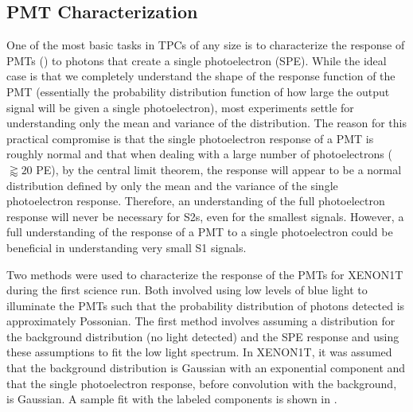 
\subsection{PMT Characterization}
\label{sec:xe1t_pmt}

One of the most basic tasks in TPCs of any size is to characterize the response of PMTs () to photons that create a single photoelectron (SPE).  While the ideal case is that we completely understand the shape of the response function of the PMT (essentially the probability distribution function of how large the output signal will be given a single photoelectron), most experiments settle for understanding only the mean and variance of the distribution.  The reason for this practical compromise is that the single photoelectron response of a PMT is roughly normal and that when dealing with a large number of photoelectrons ($\gtrapprox 20$ PE), by the central limit theorem, the response will appear to be a normal distribution defined by only the mean and the variance of the single photoelectron response.  Therefore, an understanding of the full photoelectron response will never be necessary for S2s, even for the smallest signals.  However, a full understanding of the response of a PMT to a single photoelectron could be beneficial in understanding very small S1 signals.

Two methods were used to characterize the response of the PMTs for XENON1T during the first science run.  Both involved using low levels of blue light to illuminate the PMTs such that the probability distribution of photons detected is approximately Possonian.  The first method involves assuming a distribution for the background distribution (no light detected) and the SPE response and using these assumptions to fit the low light spectrum.  In XENON1T, it was assumed that the background distribution is Gaussian with an exponential component and that the single photoelectron response, before convolution with the background, is Gaussian.  A sample fit with the labeled components is shown in .



